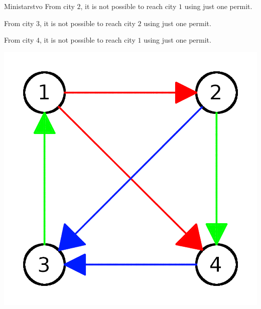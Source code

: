 \begin{statement}[
  problempoints=100,
  timelimit=1 second,
  memorylimit=1024 MiB,
]{Ministarstvo}
From city $2$, it is not possible to reach city $1$ using just one permit.

From city $3$, it is not possible to reach city $2$ using just one permit.

From city $4$, it is not possible to reach city $1$ using just one permit.


\centering
\includegraphics[scale=1]{pic/skcia3.png}
  
\end{statement}